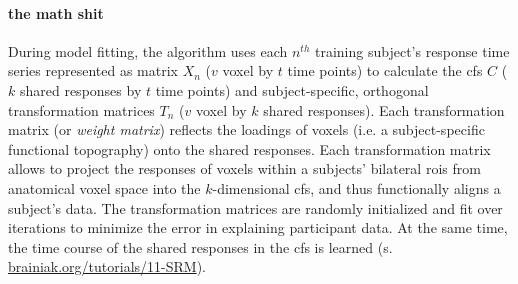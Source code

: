 %
%


\paragraph{the math shit}


During model fitting, the algorithm uses each $n^{th}$ training subject's
response time series represented as matrix $X_{n}$ ({$v$} voxel by $t$ time
points) to calculate the \ac{cfs} $C$ ($k$ shared responses by $t$ time points)
and subject-specific, orthogonal transformation matrices $T_{n}$ ($v$ voxel by
$k$ shared responses).
Each transformation matrix (or \textit{weight matrix}) reflects the loadings of
voxels (i.e. a subject-specific functional topography) onto the shared
responses.
Each transformation matrix allows to project the responses of voxels within a
subjects' bilateral \acp{roi} from anatomical voxel space into the
$k$-dimensional \ac{cfs}, and thus functionally aligns a subject's data.
The transformation matrices are randomly initialized and fit over iterations to
minimize the error in explaining participant data.
%
At the same time, the time course of the shared responses in the \ac{cfs} is
learned (s.
\href{https://brainiak.org/tutorials/11-SRM/}{\url{brainiak.org/tutorials/11-SRM}}).

